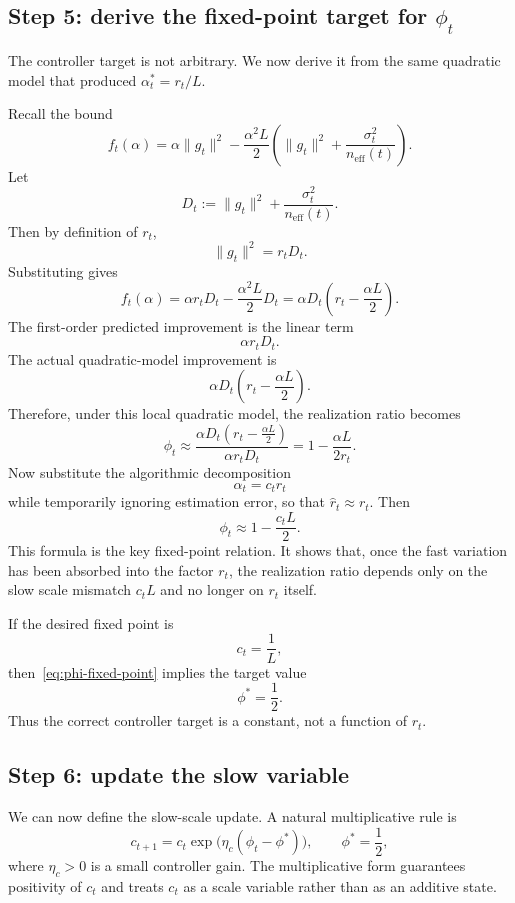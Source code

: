 \documentclass[11pt]{article}
\begin{document}
\subsection{Step 5: derive the fixed-point target for $\phi_t$}
The controller target is not arbitrary. We now derive it from the same quadratic model that produced $\alpha_t^*=r_t/L$.

Recall the bound
\[
f_t(\alpha)
=
\alpha \|g_t\|^2
-
\frac{\alpha^2L}{2}
\left(
\|g_t\|^2 + \frac{\sigma_t^2}{n_{\mathrm{eff}}(t)}
\right).
\]
Let
\[
D_t := \|g_t\|^2 + \frac{\sigma_t^2}{n_{\mathrm{eff}}(t)}.
\]
Then by definition of $r_t$,
\[
\|g_t\|^2 = r_t D_t.
\]
Substituting gives
\[
f_t(\alpha)
=
\alpha r_t D_t - \frac{\alpha^2L}{2}D_t
=
\alpha D_t\left(r_t - \frac{\alpha L}{2}\right).
\]
The first-order predicted improvement is the linear term
\[
\alpha r_t D_t.
\]
The actual quadratic-model improvement is
\[
\alpha D_t\left(r_t - \frac{\alpha L}{2}\right).
\]
Therefore, under this local quadratic model, the realization ratio becomes
\[
\phi_t
\approx
\frac{\alpha D_t\left(r_t - \frac{\alpha L}{2}\right)}{\alpha r_t D_t}
=
1 - \frac{\alpha L}{2r_t}.
\]
Now substitute the algorithmic decomposition
\[
\alpha_t = c_t r_t
\]
while temporarily ignoring estimation error, so that $\hat r_t \approx r_t$. Then
\begin{equation}
\phi_t
\approx
1 - \frac{c_tL}{2}.
\label{eq:phi-fixed-point}
\end{equation}
This formula is the key fixed-point relation. It shows that, once the fast variation has been absorbed into the factor $r_t$, the realization ratio depends only on the slow scale mismatch $c_tL$ and no longer on $r_t$ itself.

If the desired fixed point is
\[
c_t = \frac{1}{L},
\]
then~\eqref{eq:phi-fixed-point} implies the target value
\begin{equation}
\phi^* = \frac{1}{2}.
\label{eq:phi-star}
\end{equation}
Thus the correct controller target is a constant, not a function of $r_t$.

\subsection{Step 6: update the slow variable}
We can now define the slow-scale update. A natural multiplicative rule is
\begin{equation}
c_{t+1}
=
c_t\exp\bigl(\eta_c(\phi_t - \phi^*)\bigr),
\qquad
\phi^* = \frac{1}{2},
\label{eq:c-update}
\end{equation}
where $\eta_c>0$ is a small controller gain. The multiplicative form guarantees positivity of $c_t$ and treats $c_t$ as a scale variable rather than as an additive state.
\end{document}
